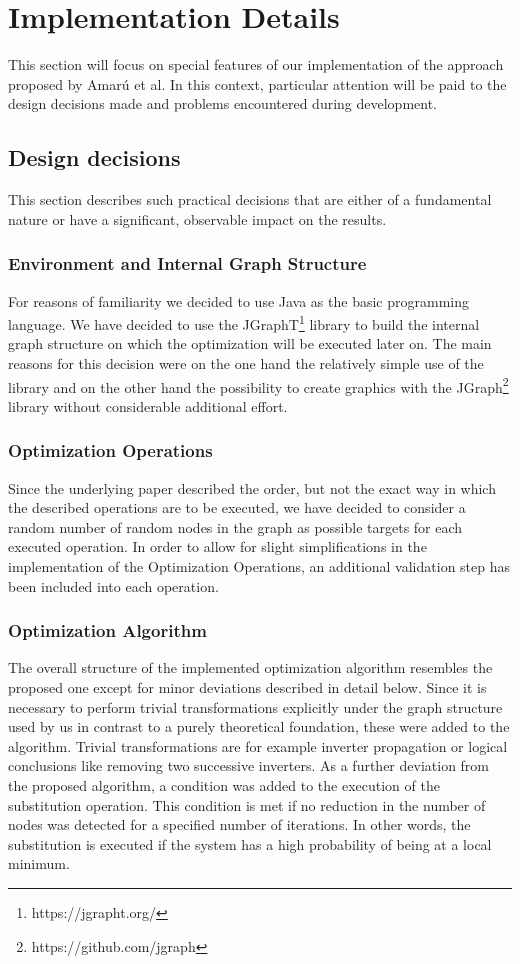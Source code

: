 \documentclass[
	accentcolor=1c,%
	type=intern,
	marginpar=false,
	ruledheaders=section,
	class=report,
	BCOR=5mm,
      parskip=half-,
	fontsize=10pt
	]{tudapub}
\begin{document}
	\section{Implementation Details}
	This section will focus on special features of our implementation of the approach proposed by Amarú et al.
	In this context, particular attention will be paid to the design decisions made and problems encountered during development.
	\subsection{Design decisions}
	This section describes such practical decisions that are either of a fundamental nature or have a significant, observable impact on the results.
		\subsubsection{Environment and Internal Graph Structure}
			For reasons of familiarity we decided to use Java as the basic programming language.
			We have decided to use the JGraphT\footnote{https://jgrapht.org/} library to build the internal graph structure on which the optimization will be executed later on.
			The main reasons for this decision were on the one hand the relatively simple use of the library and on the other hand the possibility to create graphics with the JGraph\footnote{https://github.com/jgraph} library without considerable additional effort.
		\subsubsection{Optimization Operations}
			Since the underlying paper described the order, but not the exact way in which the described operations are to be executed, we have decided to consider a random number of random nodes in the graph as possible targets for each executed operation.
			In order to allow for slight simplifications in the implementation of the Optimization Operations, an additional validation step has been included into each operation.
		\subsubsection{Optimization Algorithm}
			The overall structure of the implemented optimization algorithm resembles the proposed one except for minor deviations described in detail below.
			Since it is necessary to perform trivial transformations explicitly under the graph structure used by us in contrast to a purely theoretical foundation, these were added to the algorithm.
			Trivial transformations are for example inverter propagation or logical conclusions like removing two successive inverters.
			As a further deviation from the proposed algorithm, a condition was added to the execution of the substitution operation.
			This condition is met if no reduction in the number of nodes was detected for a specified number of iterations. In other words, the substitution is executed if the system has a high probability of being at a local minimum.
\end{document}
